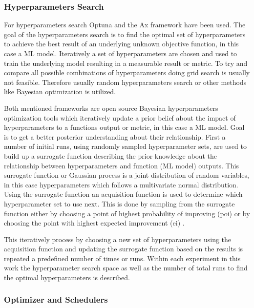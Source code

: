 \documentclass[../main.tex]{subfiles}
\begin{document}
\subsubsection{Hyperparameters Search} \label{sssec:hyperparameters_search}

For hyperparameters search Optuna \cite{optuna_2019} and the Ax \cite{noauthor_ax_nodate} framework have been used. The goal of the hyperparameters search is to find the optimal set of hyperparameters to achieve the best result of an underlying unknown objective function, in this case a ML model. Iteratively a set of hyperparameters are chosen and used to train the underlying model resulting in a measurable result or metric. To try and compare all possible combinations of hyperparameters doing grid search is usually not feasible. Therefore usually random hyperparameters search or other methods like Bayesian optimization is utilized. 
\newline

Both mentioned frameworks are open source Bayesian hyperparameters optimization tools which iteratively update a prior belief about the impact of hyperparameters to a functions output or metric, in this case a ML model. Goal is to get a better posterior understanding about their relationship. First a number of initial runs, using randomly sampled hyperparameter sets, are used to build up a surrogate function describing the prior knowledge about the relationship between hyperparameters and function (ML model) outputs. This surrogate function or Gaussian process is a joint distribution of random variables, in this case hyperparameters which follows a multivariate normal distribution. Using the surrogate function an acquisition function is used to determine which hyperparameter set to use next. This is done by sampling from the surrogate function either by choosing a point of highest probability of improving (\acs{poi}) or by choosing the point with highest expected improvement (\acs{ei}) \cite{noauthor_exploring_nodate}. 

This iteratively process by choosing a new set of hyperparameters using the acquisition function and updating the surrogate function based on the results is repeated a predefined number of times or runs. Within each experiment in this work the hyperparameter search space as well as the number of total runs to find the optimal hyperparameters is described.

\subsubsection{Optimizer and Schedulers}
\end{document}
